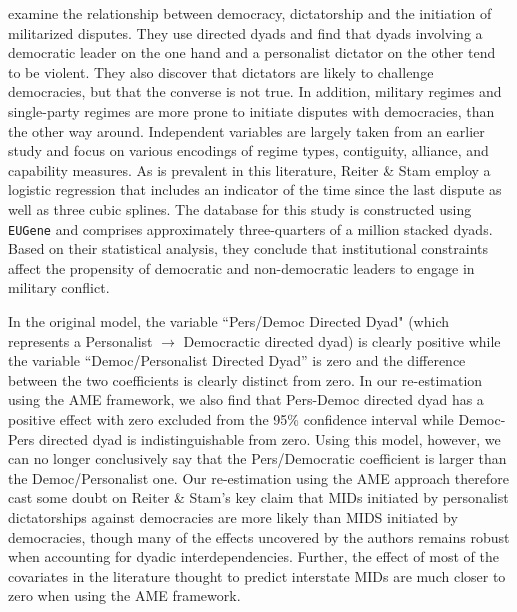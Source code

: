 \citet{reiter:stam:2003} examine the relationship between democracy, dictatorship and the initiation of militarized disputes.  They use directed dyads and find that dyads involving a democratic leader on the one hand and a personalist dictator on the other tend to be violent. They also discover that dictators are likely to challenge democracies, but that the converse is not true.  In addition, military regimes and single-party regimes are more prone to initiate disputes with democracies, than the other way around. Independent variables are largely taken from an earlier study and focus on various encodings of regime types, contiguity, alliance, and capability measures. As is prevalent in this literature, Reiter \& Stam employ a logistic regression that includes an indicator of the time since the last dispute as well as three cubic splines. The database for this study is constructed using \texttt{EUGene} \citep{bennett:stam:2000} and comprises approximately three-quarters of a million stacked dyads. Based on their statistical analysis, they conclude that institutional constraints affect the propensity of democratic and non-democratic leaders to engage in military conflict. 

In the original model, the variable ``Pers/Democ Directed Dyad" (which represents a Personalist $\rightarrow$ Democractic directed dyad) is clearly positive while the variable ``Democ/Personalist Directed Dyad'' is zero and the difference between the two coefficients is clearly distinct from zero. In our re-estimation using the AME framework, we also find that Pers-Democ directed dyad has a positive effect with zero excluded from the 95\% confidence interval while Democ-Pers directed dyad is indistinguishable from zero. Using this model, however, we can no longer conclusively say that the Pers/Democratic coefficient is larger than the Democ/Personalist one. Our re-estimation using the AME approach therefore cast some doubt on Reiter \& Stam's key claim that MIDs initiated by personalist dictatorships against democracies are more likely than MIDS initiated by democracies, though many of the effects uncovered by the authors remains robust when accounting for dyadic interdependencies. Further, the effect of most of the covariates in the literature thought to predict interstate MIDs are much closer to zero when using the AME framework. %

